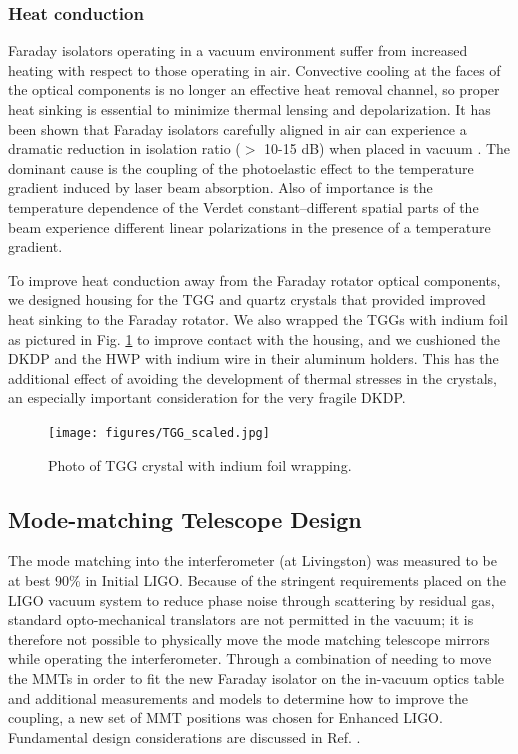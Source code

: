 \subsubsection{Heat conduction}
\label{sec:heatconduction}
Faraday isolators operating in a vacuum environment suffer from
increased heating with respect to those operating in air. Convective
cooling at the faces of the optical components is no longer an
effective heat removal channel, so proper heat sinking is essential to
minimize thermal lensing and depolarization. It has been shown that
Faraday isolators carefully aligned in air can experience a dramatic
reduction in isolation ratio ($>$ 10-15 dB) when placed in vacuum
\citep{TheVIRGOCollaboration2008Invacuum}. The dominant cause is the
coupling of the photoelastic effect to the temperature gradient
induced by laser beam absorption. Also of importance is the
temperature dependence of the Verdet constant--different spatial parts
of the beam experience different linear polarizations in the presence
of a temperature gradient.

To improve heat conduction away from the Faraday rotator optical
components, we designed housing for the TGG and quartz crystals that
provided improved heat sinking to the Faraday rotator. We also wrapped
the TGGs with indium foil as pictured in Fig. \ref{fig:TGG} to improve
contact with the housing, and we cushioned the DKDP and the HWP with
indium wire in their aluminum holders. This has the additional effect
of avoiding the development of thermal stresses in the crystals, an
especially important consideration for the very fragile DKDP.

\begin{figure}
\begin{centering}
\texttt{[image: figures/TGG\_scaled.jpg]}
  \caption[Photo indium-wrapped TGG crystal]{Photo of TGG crystal
    with indium foil wrapping.}
\label{fig:TGG}
\end{centering}
\end{figure}


\subsection{Mode-matching Telescope Design}
The mode matching into the interferometer (at Livingston) was measured
to be at best 90\% in Initial LIGO. Because of the stringent
requirements placed on the LIGO vacuum system to reduce phase noise
through scattering by residual gas, standard opto-mechanical
translators are not permitted in the vacuum; it is therefore not
possible to physically move the mode matching telescope mirrors while
operating the interferometer. Through a combination of needing to move
the MMTs in order to fit the new Faraday isolator on the in-vacuum
optics table and additional measurements and models to determine how
to improve the coupling, a new set of MMT positions was chosen for
Enhanced LIGO. Fundamental design considerations are discussed in
Ref. \citep{Delker1997Design}.




